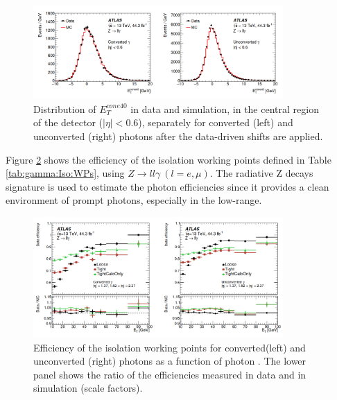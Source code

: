 \begin{figure}[htbp]
    \centering
    \includegraphics[width=0.85\textwidth]{Ch3/Img/photon_shifts_iso.png}
    \caption{Distribution of $E^{cone40}_T$ in data and simulation, in the central region of the detector ($|\eta|<$0.6), separately for converted (left) and unconverted (right) photons after the data-driven shifts are applied.}
    \label{fig:gamma:Iso:Shifts}
\end{figure}
Figure \ref{fig:gamma:Iso:Eff} shows the efficiency of the isolation working points defined in Table \ref{tab:gamma:Iso:WPs}, using $Z\rightarrow ll\gamma \ (l=e,\mu)$. The radiative Z decays signature is used to estimate the photon efficiencies since it provides a clean environment of prompt photons, especially in the low-\eT range. 
\begin{figure}[htbp]
    \centering
    \includegraphics[width=0.85\textwidth]{Ch3/Img/Photon_Iso_Eff.png}
    \caption{Efficiency of the isolation working points for converted(left) and unconverted (right) photons as a function of photon \eT. The lower panel shows the ratio of the efficiencies measured in data and in simulation (scale factors).}
    \label{fig:gamma:Iso:Eff}
\end{figure}

